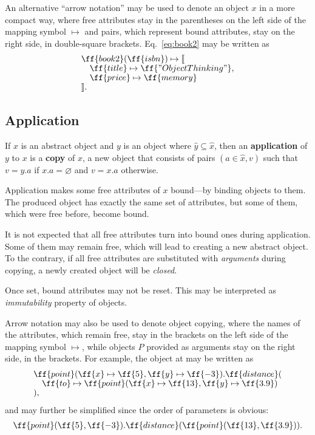 An alternative ``arrow notation'' may be used to denote an object $x$ in a more
compact way, where free attributes stay in the parentheses on the left side of the
mapping symbol $\mapsto$ and pairs,
which represent bound attributes, stay on the right side, in double-square brackets.
Eq.~\ref{eq:book2} may be written as
\begin{equation}\label{eq:book2-compact}
\begin{split}
& \ff{book2}(\ff{isbn}) \mapsto \llbracket \br
& \quad \ff{title} \mapsto \ff{"Object Thinking"}, \br
& \quad \ff{price} \mapsto \ff{memory} \br
& \rrbracket. \\
\end{split}
\end{equation}

\subsection{Application}

\begin{eodefinition}\label{def:application}
If $x$ is an abstract object and $y$ is an object
  where $\hat{y}\subseteq\hat{x}$,
  then an \textbf{application} of $y$ to $x$ is
  a \textbf{copy} of $x$, a new object that consists of pairs $(a\in\hat{x},v)$ such that
  $v=y.a$ if $x.a=\varnothing$ and $v=x.a$ otherwise.
\end{eodefinition}

Application makes some free attributes of $x$ bound---by binding objects to them.
The produced object has exactly the same set of attributes, but some of them,
which were free before, become bound.

It is not expected that all free attributes turn into bound ones during application.
Some of them may remain free, which will lead
to creating a new abstract object. To the contrary,
if all free attributes are substituted with \emph{arguments} during copying,
a newly created object will be \emph{closed}.

Once set, bound attributes may not be reset.
This may be interpreted as \emph{immutability} property of objects.

Arrow notation may also be used to denote object copying,
where the names of the attributes, which remain free, stay in the brackets
on the left side of the mapping symbol $\mapsto$,
while objects $P$ provided as arguments stay on the right side,
in the brackets. For example, the object at  may be written as
\begin{equation}\label{eq:point}
\begin{split}
& \ff{point}(\ff{x} \mapsto \ff{5}, \ff{y} \mapsto \ff{-3}).\ff{distance}(\br
& \quad \ff{to} \mapsto \ff{point}(\ff{x} \mapsto \ff{13}, \ff{y} \mapsto \ff{3.9}) \br
& ),
\end{split}
\end{equation}
and may further be simplified since the order of parameters is obvious:
\begin{equation}
\begin{split}
\ff{point}(\ff{5}, \ff{-3}).\ff{distance}(\ff{point}(\ff{13}, \ff{3.9})).
\end{split}
\end{equation}


